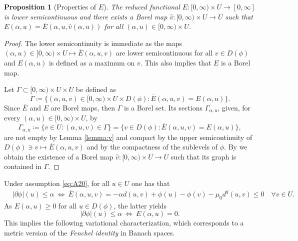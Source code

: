 \documentclass[10pt,a4paper]{amsart}
\newcommand{\ove}{\overline}
\newcommand{\haz}{\widehat}
\renewcommand{\sl}{|\partial \phi|}
\newtheorem{proposition}[theorem]{Proposition}
\begin{document}
\begin{proposition}[Properties of $ E$]\label{lemma:lsc}  
The reduced functional $ E:[0,\infty) \times U \to [0,\infty]$ is lower semicontinuous and there exists a Borel map  $\haz
v: [0,\infty) \times U \to U$ such that $ E(\alpha,u) =
\ove E(\alpha,u,\haz v(\alpha,u))$ for all $(\alpha,u)\in  [0,\infty) \times U $.
\end{proposition}

\begin{proof} The lower semicontinuity is immediate as the maps
  $(\alpha,u)\in [0,\infty) \times U \mapsto \ove E(\alpha,u,v)$ are lower
  semicontinuous for all $ v \in D(\phi)$ and $ E(\alpha,u)$
  is defined as a maximum on $v$. This also implies that $ E$ is a
  Borel map.
  
  
  Let $\Gamma \subset [0,\infty) \times U \times U$ be defined as
  \[
  \Gamma\coloneqq \{ (\alpha, u,v) \in [0,\infty) \times U \times D(\phi) :
  \ove E(\alpha, u, v) =  E(\alpha, u) \}.
  \]
  Since $\ove E$ and $ E$ are Borel maps, then $\Gamma$ is a Borel
  set. Its sections $\Gamma_{\alpha, u}$, given, for every $(\alpha, u) \in [0,\infty)\times U$, by
  \[
  \Gamma_{\alpha, u} \coloneqq \{ v \in U : (\alpha, u,v) \in \Gamma \} = \{
  v \in D(\phi) : \ove E(\alpha, u,v) =  E(\alpha, u)\},
  \]
  are not empty by Lemma \ref{lemma:v} and compact by  the 
  upper semicontinuity of $D(\phi) \ni v \mapsto \ove E(\alpha, u,v)$ and
   by   the compactness of the sublevels of $\phi$. By
  \cite[Theorem 6.9.6]{Bog07} we  obtain  the existence of a Borel map $\haz v: [0,\infty) \times U \to U$ such that its graph is contained in $\Gamma$.
\end{proof} 

 Under assumption \eqref{eq:A20},  for all $u \in
    U$   one has that 
    \begin{align} &\sl(u) \leq \alpha\  \Leftrightarrow \   \ove
    E(\alpha,u,v) =  - \alpha d(u,v)+\phi(u)-\phi(v) -{ \mu_0 
        } d^q(u, v)\leq 0\quad \forall v \in
  U.\label{eq:compare}
\end{align}
As $ E(\alpha,u)\geq 0$ for all $u \in D(\phi)$, the latter yields 
  \begin{equation} \sl(u) \leq
  \alpha \ \Leftrightarrow \  E(\alpha,u)=0. \label{eq:max}
\end{equation}
  This implies the following variational
characterization, which corresponds to a metric version of the
{\it Fenchel identity} in Banach spaces.
\end{document}
